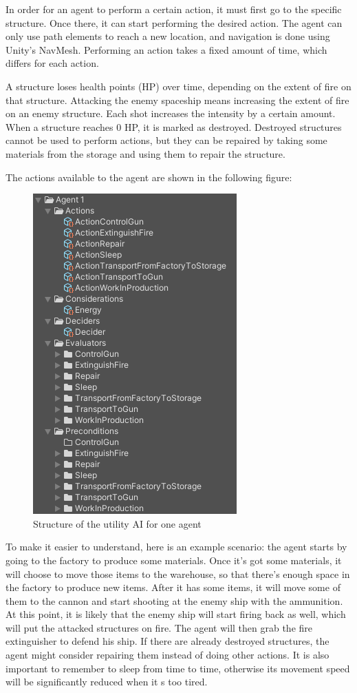 In order for an agent to perform a certain action, it must first go to the specific structure. Once there, it can start performing the desired action. The agent can only use path elements to reach a new location, and navigation is done using Unity's NavMesh. Performing an action takes a fixed amount of time, which differs for each action.

A structure loses health points (HP) over time, depending on the extent of fire on that structure. Attacking the enemy spaceship means increasing the extent of fire on an enemy structure. Each shot increases the intensity by a certain amount. When a structure reaches 0 HP, it is marked as destroyed. Destroyed structures cannot be used to perform actions, but they can be repaired by taking some materials from the storage and using them to repair the structure.

\newpage

The actions available to the agent are shown in the following figure:

\begin{figure}[H]
	\centering
		\includegraphics[scale=0.6]{images/utility_ai_spaceship.png}
	\caption{Structure of the utility AI for one agent}
	\label{fig:utility_ai_spaceship}
\end{figure}

To make it easier to understand, here is an example scenario: the agent starts by going to the factory to produce some materials. Once it's got some materials, it will choose to move those items to the warehouse, so that there's enough space in the factory to produce new items. After it has some items, it will move some of them to the cannon and start shooting at the enemy ship with the ammunition. At this point, it is likely that the enemy ship will start firing back as well, which will put the attacked structures on fire. The agent will then grab the fire extinguisher to defend his ship. If there are already destroyed structures, the agent might consider repairing them instead of doing other actions. It is also important to remember to sleep from time to time, otherwise its movement speed will be significantly reduced when it s too tired.

